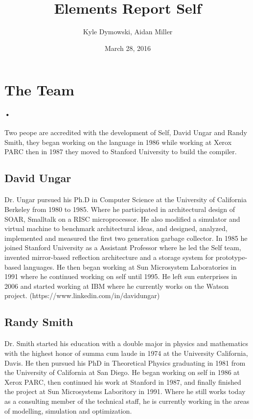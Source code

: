 \documentclass[12pt]{article}
\title{Elements Report Self}
\author{Kyle Dymowski, Aidan Miller}
\date{March 28, 2016}
\begin{document}
\section{The Team}
\paragraph{•} Two peope are accredited with the development of Self, David Ungar and Randy Smith, they began working on the language in 1986 while working at Xerox PARC then in 1987 they moved to Stanford University to build the compiler. 
\subsection{David Ungar}
\paragraph{} Dr. Ungar pursued his Ph.D in Computer Science at the University of California Berkeley from 1980 to 1985. Where he participated in architectural design of SOAR, Smalltalk on a RISC microprocessor. He also modified a simulator and virtual machine to benchmark architectural ideas, and designed, analyzed, implemented and measured the first two generation garbage collector. In 1985 he joined Stanford University as a Assistant Professor where he led the Self team, invented mirror-based reflection architecture and a storage system for prototype-based languages. He then began working at Sun Microsystem Laboratories in 1991 where he continued working on self until 1995. He left sun enterprises in 2006 and started working at IBM where he currently works on the Watson project. (https://www.linkedin.com/in/davidungar) 

\subsection{Randy Smith}
\paragraph{} Dr. Smith started his education with a double major in physics and mathematics with the highest honor of summa cum laude in 1974 at the University California, Davis. He then pursued his PhD in Theoretical Physics graduating in 1981 from the University of California at San Diego. He began working on self in 1986 at Xerox PARC, then continued his work at Stanford in 1987, and finally finished the project at Sun Microsystems Laboritory in 1991. Where he still works today as a consulting member of the technical staff, he is currently working in the areas of modelling, simulation and optimization. 
\end{document}
